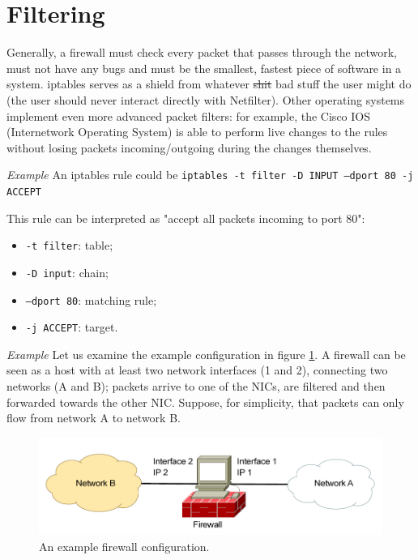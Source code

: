 
\section{Filtering}
Generally, a firewall must check every packet that passes through the network, must not have any bugs and must be the smallest, fastest piece of software in a system. iptables serves as a shield from whatever \sout{shit} bad stuff the user might do (the user should never interact directly with Netfilter). Other operating systems implement even more advanced packet filters: for example, the Cisco IOS (Internetwork Operating System) is able to perform live changes to the rules without losing packets incoming/outgoing during the changes themselves.

\vspace{0.5em}

\emph{Example} An iptables rule could be \texttt{iptables -t filter -D INPUT –dport 80 -j ACCEPT}

This rule can be interpreted as "accept all packets incoming to port 80":

\begin{itemize}
    \item \texttt{-t filter}: table;
    \item \texttt{-D input}: chain;
    \item \texttt{–dport 80}: matching rule;
    \item \texttt{-j ACCEPT}: target.
\end{itemize}

\vspace{0.5em}

\emph{Example} Let us examine the example configuration in figure \ref{fig:fw_example}. A firewall can be seen as a host with at least two network interfaces (1 and 2), connecting two networks (A and B); packets arrive to one of the NICs, are filtered and then forwarded towards the other NIC. Suppose, for simplicity, that packets can only flow from network A to network B.

\begin{figure}[h]
    \centering
    \includegraphics[scale=0.7]{img/fw_example.png}
    \decoRule
    \caption{An example firewall configuration.}
    \label{fig:fw_example}
\end{figure}

